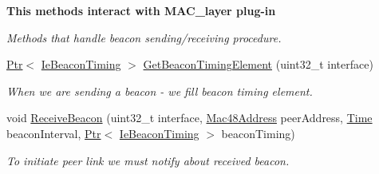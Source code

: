 \begin{Indent}{\bf This methods interact with M\+A\+C\+\_\+layer plug-\/in}\par
{\em Methods that handle beacon sending/receiving procedure. }\begin{DoxyCompactItemize}
\item 
\hyperlink{classns3_1_1Ptr}{Ptr}$<$ \hyperlink{classns3_1_1dot11s_1_1IeBeaconTiming}{Ie\+Beacon\+Timing} $>$ \hyperlink{classns3_1_1dot11s_1_1PeerManagementProtocol_ac5ed85738276098fce86bfb5b0dd9fe1}{Get\+Beacon\+Timing\+Element} (uint32\+\_\+t interface)
\begin{DoxyCompactList}\small\item\em When we are sending a beacon -\/ we fill beacon timing element. \end{DoxyCompactList}\item 
void \hyperlink{classns3_1_1dot11s_1_1PeerManagementProtocol_a536fcf8973c4e3e515f984ee8af18f7e}{Receive\+Beacon} (uint32\+\_\+t interface, \hyperlink{classns3_1_1Mac48Address}{Mac48\+Address} peer\+Address, \hyperlink{classns3_1_1Time}{Time} beacon\+Interval, \hyperlink{classns3_1_1Ptr}{Ptr}$<$ \hyperlink{classns3_1_1dot11s_1_1IeBeaconTiming}{Ie\+Beacon\+Timing} $>$ beacon\+Timing)
\begin{DoxyCompactList}\small\item\em To initiate peer link we must notify about received beacon. \end{DoxyCompactList}\end{DoxyCompactItemize}
\end{Indent}
{\bf }\par
